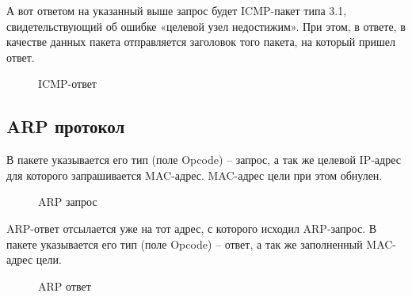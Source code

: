 \documentclass[a4paper, 14pt,russian]{article}
\begin{document}
	А вот ответом на указанный выше запрос будет ICMP-пакет типа 3.1, свидетельствующий об ошибке «целевой узел недостижим». При этом, в ответе, в качестве данных пакета отправляется заголовок того пакета, на который пришел ответ.
	\begin{figure}[h!]
		\caption{ICMP-ответ}
		\label{img:error_ping2}
	\end{figure}

\newpage
\subsection{ARP протокол}
В пакете указывается его тип (поле Opcode) – запрос, а так же целевой IP-адрес для которого запрашивается MAC-адрес. MAC-адрес цели при этом обнулен.

\begin{figure}[h!]
	\caption{ARP запрос}
	\label{img:arp_req}
\end{figure}

ARP-ответ отсылается уже на тот адрес, с которого исходил ARP-запрос. В пакете указывается его тип (поле Opcode) – ответ, а так же заполненный MAC-адрес цели.
\begin{figure}[h!]
	\caption{ARP ответ}
	\label{img:arp_answ}
\end{figure}
\end{document}
